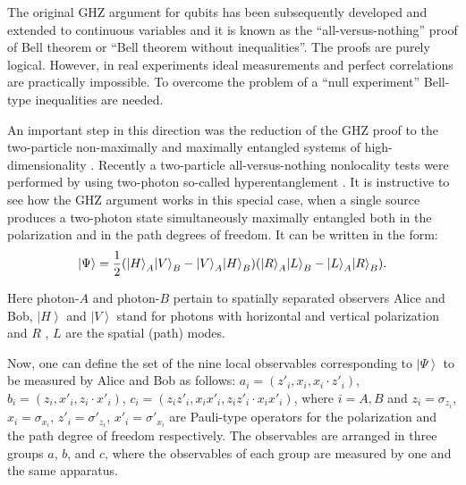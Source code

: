 \documentclass[twocolumn,aps,rmp]{revtex4}
\begin{document}
The original GHZ argument for qubits has been subsequently developed
\cite {Mermin,CerfMP,Hardy93,Cabello1,Cabello2,ChenPZBZ2003,GHZ1,GHZ2}
and extended to continuous variables \cite {Clifton,MassarP,ChenZ} and
it is known as the ``all-versus-nothing'' proof of Bell theorem or
``Bell theorem without inequalities''. The proofs are purely logical.
However, in real experiments ideal measurements and perfect
correlations are practically impossible. To overcome the problem of a
``null experiment'' Bell-type inequalities are needed.

An important step in this direction was the reduction of the GHZ proof
to the two-particle non-maximally \cite {Hardy93} and maximally
entangled systems of high-dimensionality \cite
{Pan,Kaszlikowski,Durt,Chen2,Mandel}. Recently a two-particle
all-versus-nothing nonlocality tests were performed by using
two-photon so-called hyperentanglement \cite {Zukowski,Martini}. It is
instructive to see how the GHZ argument works in this special case,
when a single source produces a two-photon state simultaneously
maximally entangled both in the polarization and in the path degrees
of freedom. It can be written in the form:
\begin{equation}
\left|\Psi\right\rangle = {1\over 2}({\left|H\right\rangle_A}{\left|V\right\rangle_B}-{\left|V\right\rangle_A}{\left|H\right\rangle_B})({\left|R\right\rangle_A}{\left|L\right\rangle_B}-{\left|L\right\rangle_A}{\left|R\right\rangle_B}).
\label{psi}
\end{equation}

Here photon-$A$ and photon-$B$ pertain to spatially separated
observers Alice and Bob, $\left|H\right\rangle$ and
$\left|V\right\rangle$ stand for photons with horizontal and
vertical polarization and $R$ , $L$ are the spatial (path) modes.

Now, one can define the set of the nine local observables
corresponding to $\left|\Psi\right\rangle$ to be measured by Alice
and Bob as follows: $a_i = ({{z'_i}},{x_i},{x_i}\cdot{z'_i})$, $b_i
= (z_i,x'_i,z_i\cdot{x'_i})$,  $c_i =(z_iz'_i,x_ix'_i,z_iz'_i
\cdot{x_ix'_i})$, where $i=A,B$ and $z_i = \sigma_{z_i}$, $x_i =
\sigma_{x_i}$, $z'_i = \sigma'_{z_i}$, $x'_i = \sigma'_{x_i}$ are
Pauli-type operators for the polarization and the path degree of
freedom respectively. The observables are arranged in three groups
$a$, $b$, and $c$, where the observables of each group are measured
by one and the same apparatus.
\end{document}
